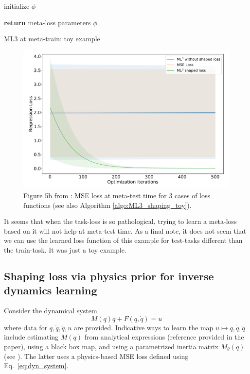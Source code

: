 \begin{algorithm}[H]
	\SetAlgoLined
	initialize $\phi$
	
	\textbf{return} meta-loss parameters $\phi$
	\caption{ML3 at meta-train: toy example}
	\label{algo:ML3_shaping_toy}
\end{algorithm}
\begin{figure}[H]
	\centering
	\includegraphics[width=0.7\linewidth]{./Figures/fig5b.png}
	\caption{Figure 5b from \textcite{bechtle2020metalearning}: MSE loss at meta-test time for 3 cases of loss functions (see also Algorithm \ref{algo:ML3_shaping_toy}).}
	\label{fig:fig5b}
\end{figure}

It seems that when the task-loss is so pathological, trying to learn a meta-loss based on it will not help at meta-test time.
As a final note, it does not seem that we can use the learned loss function of this example for test-tasks different than the train-task. 
It was just a toy example.

\subsection{Shaping loss via physics prior for inverse dynamics learning}
Consider the dynamical system
\begin{equation}\label{eq:dyn_system}
	M(q)\ddot{q}+F(q,\dot{q}) = u
\end{equation}
where data for $q,\dot{q},\ddot{q},u$ are provided. 
Indicative ways to learn the map $u \mapsto q,\dot{q},\ddot{q}$ include estimating $M(q)$ from analytical expressions (reference provided in the paper), using a black box map, and using a parametrized inertia matrix $M_{\theta}(q)$ (see \cite{lutter2019deep}).
The latter uses a physics-based MSE loss defined using Eq.~\eqref{eq:dyn_system}.


